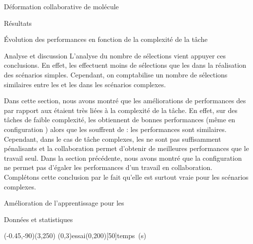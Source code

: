 \documentclass[myfrancais,ngerman,english,frenchb]{mythesis}
\begin{document}
\begin{mychapter}{Déformation collaborative de molécule}
\begin{mysection}{Résultats}
\begin{mysubsection}{Évolution des performances en fonction de la complexité de la tâche}
\begin{mysubsubsection}{Analyse et discussion}
					L'analyse du nombre de sélections vient appuyer ces conclusions.
					En effet, les  effectuent moins de sélections que les  dans la réalisation des scénarios simples.
					Cependant, on comptabilise un nombre de sélections similaires entre les  et les  dans les scénarios complexes.

					Dans cette section, nous avons montré que les améliorations de performances des  par rapport aux  étaient très liées à la complexité de la tâche.
					En effet, sur des tâches de faible complexité, les  obtiennent de bonnes performances (même en configuration ) alors que les  souffrent de  : les performances sont similaires.
					Cependant, dans le cas de tâche complexes, les  ne sont pas suffisamment pénalisants et la collaboration permet d'obtenir de meilleures performances que le travail seul.
					Dans la section précédente, nous avons montré que la configuration  ne permet pas d'égaler les performances d'un travail en collaboration.
					Complétons cette conclusion par le fait qu'elle est surtout vraie pour les scénarios complexes.
				\end{mysubsubsection}
			\end{mysubsection}
			\begin{mysubsection}{Amélioration de l'apprentissage pour les }
				\begin{mysubsubsection}{Données et statistiques}
					\begin{myfigure}
						\begin{myps}(-0.45,-90)(3,250)
							\myaxes(0,3){essai}(0,200)[50]{temps~(s)}
						\end{myps}
					\end{myfigure}


\end{mysubsubsection}
\end{mysubsection}
\end{mysection}
\end{mychapter}
\end{document}
